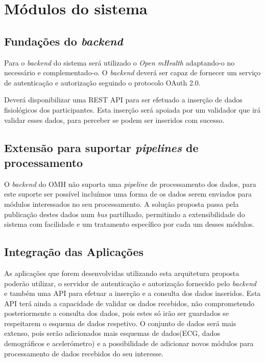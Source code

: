 \section{Módulos do sistema}
\subsection{Fundações do \textit{backend}}
Para o \textit{backend} do sistema será utilizado o \textit{Open mHealth} adaptando-o no necessário e complementado-o. O \textit{backend} deverá ser capaz de fornecer um serviço de autenticação e autorização seguindo o protocolo OAuth 2.0. \par 
Deverá disponibilizar uma \gls{REST} \gls{API} para ser efetuado a inserção de dados fisiológicos dos participantes. Esta inserção será apoiada por um validador que irá validar esses dados, para perceber se podem ser inseridos com sucesso.


\subsection{Extensão para suportar \textit{pipelines} de processamento}
O \textit{backend} do \gls{OMH} não suporta uma \textit{pipeline} de processamento dos dados, para este suporte ser possível incluímos uma forma de os dados serem enviados para módulos interessados no seu processamento. A solução proposta passa pela publicação destes dados num \textit{bus} partilhado, permitindo a extensibilidade do sistema com facilidade e um tratamento específico por cada um desses módulos.


\subsection{Integração das Aplicações}
As aplicações que forem desenvolvidas utilizando esta arquitetura proposta poderão utilizar, o servidor de autenticação e autorização fornecido pelo \textit{backend} e também uma \gls{API} para efetuar a inserção e a consulta dos dados inseridos. Esta \gls{API} terá ainda a capacidade de validar os dados recebidos, não comprometendo posteriormente a consulta dos dados, pois estes só irão ser guardados se respeitarem o esquema de dados respetivo. O conjunto de dados será mais extenso, pois serão adicionados mais esquemas de dados(\gls{ECG}, dados demográficos e acelerómetro) e a possibilidade de adicionar novos módulos para processamento de dados recebidos do seu interesse.





